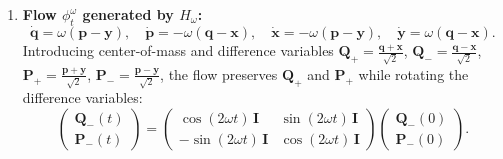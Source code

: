 \documentclass[11pt,a4paper,reqno]{article}
\theoremstyle{plain}
\theoremstyle{definition}
\theoremstyle{remark}
\numberwithin{equation}{section}
\begin{document}
\begin{enumerate}
    \item \textbf{Flow $\phi_t^\omega$ generated by $H_\omega$:}
    \begin{equation}
    \dot{\bm{q}} = \omega(\bm{p} - \bm{y}), \quad \dot{\bm{p}} = -\omega(\bm{q} - \bm{x}), \quad \dot{\bm{x}} = -\omega(\bm{p} - \bm{y}), \quad \dot{\bm{y}} = \omega(\bm{q} - \bm{x}).
    \end{equation}
    Introducing center-of-mass and difference variables $\bm{Q}_+ = \frac{\bm{q} + \bm{x}}{\sqrt{2}}$, $\bm{Q}_- = \frac{\bm{q} - \bm{x}}{\sqrt{2}}$, $\bm{P}_+ = \frac{\bm{p} + \bm{y}}{\sqrt{2}}$, $\bm{P}_- = \frac{\bm{p} - \bm{y}}{\sqrt{2}}$, the flow preserves $\bm{Q}_+$ and $\bm{P}_+$ while rotating the difference variables:
    \begin{equation}
    \begin{pmatrix} \bm{Q}_-(t) \\ \bm{P}_-(t) \end{pmatrix} = \begin{pmatrix} \cos(2\omega t) \, \bm{I} & \sin(2\omega t) \, \bm{I} \\ -\sin(2\omega t) \, \bm{I} & \cos(2\omega t) \, \bm{I} \end{pmatrix} \begin{pmatrix} \bm{Q}_-(0) \\ \bm{P}_-(0) \end{pmatrix}.
    \label{eq:harmonic_rotation}
    \end{equation}
\end{enumerate}
\end{document}

